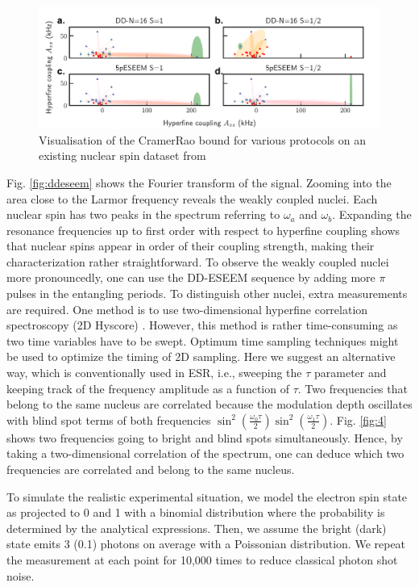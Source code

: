 \documentclass[%
 reprint,
superscriptaddress,
 amsmath,amssymb,
 aps,
]{revtex4-2}
\begin{document}
\label{sec:discussion}
\begin{figure}%
	\begin{center}
		\includegraphics[width=1.0\textwidth]{figure_4.pdf}
		\caption{Visualisation of the CramerRao bound for various protocols on an existing nuclear spin dataset from \cite{abobeih2019atomic}}
		\label{fig:cov}
	\end{center}
\end{figure}
Fig. \ref{fig:ddeseem} shows the Fourier transform of the signal.
Zooming into the area close to the Larmor frequency reveals the weakly coupled nuclei.
Each nuclear spin has two peaks in the spectrum referring to $\omega_a$ and $\omega_b$. Expanding the resonance frequencies up to first order with respect to hyperfine coupling shows that nuclear spins appear in order of their coupling strength, making their characterization rather straightforward.
To observe the weakly coupled nuclei more pronouncedly, one can use the DD-ESEEM sequence by adding more $\pi$ pulses in the entangling periods.
To distinguish other nuclei, extra measurements are required.
One method is to use two-dimensional hyperfine correlation spectroscopy (2D Hyscore) \cite{vorobyov2022addressing}.
However, this method is rather time-consuming as two time variables have to be swept.
Optimum time sampling techniques might be used to optimize the timing of 2D sampling.
Here we suggest an alternative way, which is conventionally used in ESR, i.e., sweeping the $\tau$ parameter and keeping track of the frequency amplitude as a function of $\tau$.
Two frequencies that belong to the same nucleus are correlated because the modulation depth oscillates with blind spot terms of both frequencies $\sin^2(\frac{\omega_0 \tau}{2}) \sin^2(\frac{\omega_1 \tau}{2})$.
Fig. \ref{fig:4} shows two frequencies going to bright and blind spots simultaneously.
Hence, by taking a two-dimensional correlation of the spectrum, one can deduce which two frequencies are correlated and belong to the same nucleus.

To simulate the realistic experimental situation, we model the electron spin state as projected to 0 and 1 with a binomial distribution where the probability is determined by the analytical expressions. Then, we assume the bright (dark) state emits 3 (0.1) photons on average with a Poissonian distribution. We repeat the measurement at each point for 10,000 times to reduce classical photon shot noise.
\end{document}
